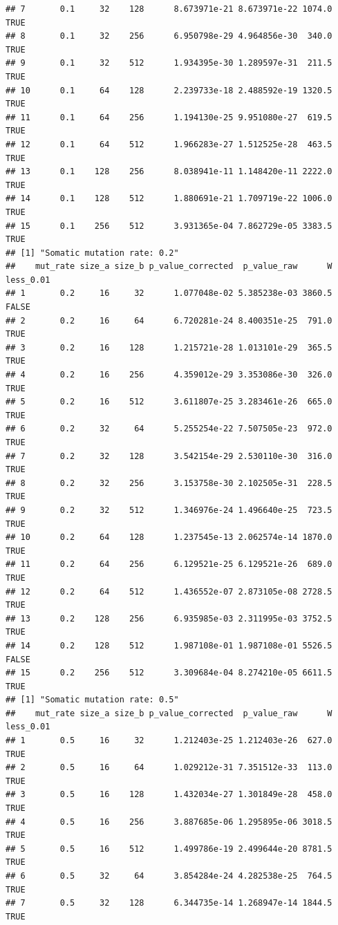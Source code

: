 \documentclass[]{book}
\begin{document}
\begin{verbatim}
## 7       0.1     32    128      8.673971e-21 8.673971e-22 1074.0      TRUE
## 8       0.1     32    256      6.950798e-29 4.964856e-30  340.0      TRUE
## 9       0.1     32    512      1.934395e-30 1.289597e-31  211.5      TRUE
## 10      0.1     64    128      2.239733e-18 2.488592e-19 1320.5      TRUE
## 11      0.1     64    256      1.194130e-25 9.951080e-27  619.5      TRUE
## 12      0.1     64    512      1.966283e-27 1.512525e-28  463.5      TRUE
## 13      0.1    128    256      8.038941e-11 1.148420e-11 2222.0      TRUE
## 14      0.1    128    512      1.880691e-21 1.709719e-22 1006.0      TRUE
## 15      0.1    256    512      3.931365e-04 7.862729e-05 3383.5      TRUE
## [1] "Somatic mutation rate: 0.2"
##    mut_rate size_a size_b p_value_corrected  p_value_raw      W less_0.01
## 1       0.2     16     32      1.077048e-02 5.385238e-03 3860.5     FALSE
## 2       0.2     16     64      6.720281e-24 8.400351e-25  791.0      TRUE
## 3       0.2     16    128      1.215721e-28 1.013101e-29  365.5      TRUE
## 4       0.2     16    256      4.359012e-29 3.353086e-30  326.0      TRUE
## 5       0.2     16    512      3.611807e-25 3.283461e-26  665.0      TRUE
## 6       0.2     32     64      5.255254e-22 7.507505e-23  972.0      TRUE
## 7       0.2     32    128      3.542154e-29 2.530110e-30  316.0      TRUE
## 8       0.2     32    256      3.153758e-30 2.102505e-31  228.5      TRUE
## 9       0.2     32    512      1.346976e-24 1.496640e-25  723.5      TRUE
## 10      0.2     64    128      1.237545e-13 2.062574e-14 1870.0      TRUE
## 11      0.2     64    256      6.129521e-25 6.129521e-26  689.0      TRUE
## 12      0.2     64    512      1.436552e-07 2.873105e-08 2728.5      TRUE
## 13      0.2    128    256      6.935985e-03 2.311995e-03 3752.5      TRUE
## 14      0.2    128    512      1.987108e-01 1.987108e-01 5526.5     FALSE
## 15      0.2    256    512      3.309684e-04 8.274210e-05 6611.5      TRUE
## [1] "Somatic mutation rate: 0.5"
##    mut_rate size_a size_b p_value_corrected  p_value_raw      W less_0.01
## 1       0.5     16     32      1.212403e-25 1.212403e-26  627.0      TRUE
## 2       0.5     16     64      1.029212e-31 7.351512e-33  113.0      TRUE
## 3       0.5     16    128      1.432034e-27 1.301849e-28  458.0      TRUE
## 4       0.5     16    256      3.887685e-06 1.295895e-06 3018.5      TRUE
## 5       0.5     16    512      1.499786e-19 2.499644e-20 8781.5      TRUE
## 6       0.5     32     64      3.854284e-24 4.282538e-25  764.5      TRUE
## 7       0.5     32    128      6.344735e-14 1.268947e-14 1844.5      TRUE

\end{verbatim}
\end{document}

